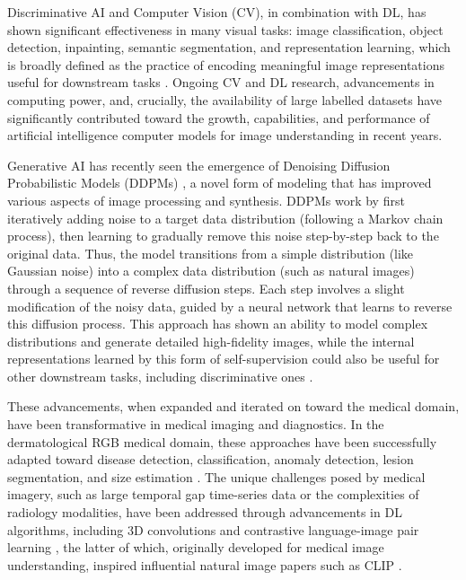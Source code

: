 \documentclass[11pt]{ucthesis}
\begin{document}
Discriminative AI and Computer Vision (CV), in combination with DL, has shown significant effectiveness in many visual tasks: image classification, object detection, inpainting, semantic segmentation, and representation learning, which is broadly defined as the practice of encoding meaningful image representations useful for downstream tasks \cite{Chai2021DeepLI, chen2020simple, chen2020big}. Ongoing CV and DL research, advancements in computing power, and, crucially, the availability of large labelled datasets have significantly contributed toward the growth, capabilities, and performance of artificial intelligence computer models for image understanding in recent years.

Generative AI has recently seen the emergence of Denoising Diffusion Probabilistic Models (DDPMs) \cite{Ho2020DenoisingDP}, a novel form of modeling that has improved various aspects of image processing and synthesis. DDPMs work by first iteratively adding noise to a target data distribution (following a Markov chain process), then learning to gradually remove this noise step-by-step back to the original data. Thus, the model transitions from a simple distribution (like Gaussian noise) into a complex data distribution (such as natural images) through a sequence of reverse diffusion steps. Each step involves a slight modification of the noisy data, guided by a neural network that learns to reverse this diffusion process. This approach has shown an ability to model complex distributions and generate detailed high-fidelity images, while the internal representations learned by this form of self-supervision could also be useful for other downstream tasks, including discriminative ones \cite{baranchuk_2022_labelefficient}.

These advancements, when expanded and iterated on toward the medical domain, have been transformative in medical imaging and diagnostics. In the dermatological RGB medical domain, these approaches have been successfully adapted toward disease detection, classification, anomaly detection, lesion segmentation, and size estimation \cite{Esteva2021DeepLM, carrion2021automatic}. The unique challenges posed by medical imagery, such as large temporal gap time-series data or the complexities of radiology modalities, have been addressed through advancements in DL algorithms, including 3D convolutions and contrastive language-image pair learning \cite{Tran2014LearningSF, Zhang2020ContrastiveLO}, the latter of which, originally developed for medical image understanding, inspired influential natural image papers such as CLIP \cite{Radford2021LearningTV}.
\end{document}

